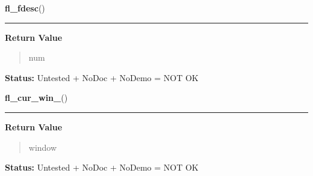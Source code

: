     \label{xformslib:library:fl_fdesc_}

    \vspace{0.5ex}

\hspace{.8\funcindent}\begin{boxedminipage}{\funcwidth}

    \raggedright \textbf{fl\_fdesc}()

    \vspace{-1.5ex}

    \rule{\textwidth}{0.5\fboxrule}
\setlength{\parskip}{2ex}
\setlength{\parskip}{1ex}
      \textbf{Return Value}
    \vspace{-1ex}

      \begin{quote}
      num

      \end{quote}

\textbf{Status:} Untested + NoDoc + NoDemo = NOT OK



    \end{boxedminipage}

    \label{xformslib:library:fl_cur_win_}

    \vspace{0.5ex}

\hspace{.8\funcindent}\begin{boxedminipage}{\funcwidth}

    \raggedright \textbf{fl\_cur\_win\_}()

    \vspace{-1.5ex}

    \rule{\textwidth}{0.5\fboxrule}
\setlength{\parskip}{2ex}
\setlength{\parskip}{1ex}
      \textbf{Return Value}
    \vspace{-1ex}

      \begin{quote}
      window

      \end{quote}

\textbf{Status:} Untested + NoDoc + NoDemo = NOT OK



    \end{boxedminipage}

